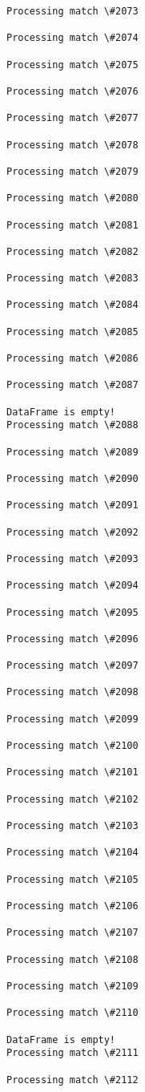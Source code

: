 \documentclass[11pt]{article}
\begin{document}
\begin{Verbatim}[commandchars=\\\{\}]
Processing match \#2073

Processing match \#2074

Processing match \#2075

Processing match \#2076

Processing match \#2077

Processing match \#2078

Processing match \#2079

Processing match \#2080

Processing match \#2081

Processing match \#2082

Processing match \#2083

Processing match \#2084

Processing match \#2085

Processing match \#2086

Processing match \#2087

DataFrame is empty!
Processing match \#2088

Processing match \#2089

Processing match \#2090

Processing match \#2091

Processing match \#2092

Processing match \#2093

Processing match \#2094

Processing match \#2095

Processing match \#2096

Processing match \#2097

Processing match \#2098

Processing match \#2099

Processing match \#2100

Processing match \#2101

Processing match \#2102

Processing match \#2103

Processing match \#2104

Processing match \#2105

Processing match \#2106

Processing match \#2107

Processing match \#2108

Processing match \#2109

Processing match \#2110

DataFrame is empty!
Processing match \#2111

Processing match \#2112


\end{Verbatim}
\end{document}

